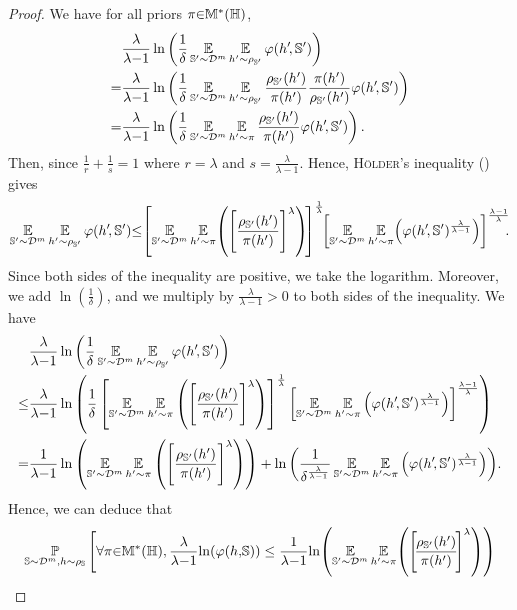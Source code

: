 \begin{noaddcontents}
\begin{proof}
We have for all priors $\pi{\in}\mathbb{M}^{*}(\mathbb{H})$,
\begin{align*}
&\frac{\lambda}{\lambda{-}1}\ln\left(\frac{1}{\delta}\operatorname*{\mathbb{E}}_{\mathbb{S}'{\sim}\mathcal{D}^{m}}\operatorname*{\mathbb{E}}_{h'{\sim} \rho_{\mathbb{S}'} }\varphi(h'\!, \mathbb{S}')\right)\\
= &\frac{\lambda}{\lambda{-}1}\ln\left(\frac{1}{\delta}\operatorname*{\mathbb{E}}_{\mathbb{S}'{\sim}\mathcal{D}^{m}}\operatorname*{\mathbb{E}}_{h'{\sim} \rho_{\mathbb{S}'} }\frac{\rho_{\mathbb{S}'} (h')}{\pi(h')}\frac{\pi(h')}{\rho_{\mathbb{S}'} (h')}\varphi(h'\!, \mathbb{S}')\right)\\
= &\frac{\lambda}{\lambda{-}1}\ln\left(\frac{1}{\delta}\operatorname*{\mathbb{E}}_{\mathbb{S}'{\sim}\mathcal{D}^{m}}\operatorname*{\mathbb{E}}_{h'{\sim} \pi}\frac{\rho_{\mathbb{S}'} (h')}{\pi(h')}\varphi(h'\!, \mathbb{S}')\right).
\end{align*}
Then, since $\tfrac{1}{r}+\tfrac{1}{s}=1$ where $r{=}\lambda$ and $s{=}\frac{\lambda}{\lambda-1}$. Hence, \textsc{Hölder}'s inequality () gives
\begin{align*}
    \EE_{\S'{\sim}\D^{\m}}\EE_{\h'{\sim} \AQp}\varphi(\h'\!, \S'){\le}\!\LB\EE_{\S'{\sim}\D^{\m}}\EE_{\h'{\sim} \P}\!\LP\Bigg[\frac{\AQp (\h')}{\P(\h')}\Bigg]^{\lambda}\RP\!\RB^{\frac{1}{\lambda}}\!\!\LB\EE_{\S'{\sim}\D^{\m}}\EE_{\h'{\sim} \P}\!\LP\varphi(\h'\!, \S')^{\frac{\lambda}{\lambda-1}}\RP\RB^{\frac{\lambda-1}{\lambda}}\!\!\!.
\end{align*}
Since both sides of the inequality are positive, we take the logarithm.
Moreover, we add $\ln(\tfrac{1}{\delta})$, and we multiply by $\frac{\lambda}{\lambda-1}>0$ to both sides of the inequality.
We have
\begin{align*}
    &\frac{\lambda}{\lambda{-}1}\ln\left(\frac{1}{\delta}\operatorname*{\mathbb{E}}_{\mathbb{S}'{\sim}\mathcal{D}^{m}}\operatorname*{\mathbb{E}}_{h'{\sim} \rho_{\mathbb{S}'} }\varphi(h'\!, \mathbb{S}')\right) \\
    \le &\frac{\lambda}{\lambda{-}1}\ln\left(\frac{1}{\delta}\left[\operatorname*{\mathbb{E}}_{\mathbb{S}'{\sim}\mathcal{D}^{m}}\operatorname*{\mathbb{E}}_{h'{\sim} \pi}\left(\Bigg[\frac{\rho_{\mathbb{S}'} (h')}{\pi(h')}\Bigg]^{\lambda}\right)\right]^{\frac{1}{\lambda}}\left[\operatorname*{\mathbb{E}}_{\mathbb{S}'{\sim}\mathcal{D}^{m}}\operatorname*{\mathbb{E}}_{h'{\sim} \pi}\left(\varphi(h'\!, \mathbb{S}')^{\frac{\lambda}{\lambda-1}}\right)\right]^{\frac{\lambda-1}{\lambda}}\right)\\
    = &\frac{1}{\lambda{-}1}\ln\left(\operatorname*{\mathbb{E}}_{\mathbb{S}'{\sim}\mathcal{D}^{m}}\operatorname*{\mathbb{E}}_{h'{\sim} \pi}\left(\Bigg[\frac{\rho_{\mathbb{S}'} (h')}{\pi(h')}\Bigg]^{\lambda}\right)\right) + \ln\left(\frac{1}{\delta^{\frac{\lambda}{\lambda{-}1}}}\operatorname*{\mathbb{E}}_{\mathbb{S}'{\sim}\mathcal{D}^{m}}\operatorname*{\mathbb{E}}_{h'{\sim} \pi}\left(\varphi(h'\!, \mathbb{S}')^{\frac{\lambda}{\lambda-1}}\right)\right)\!.
\end{align*}
Hence, we can deduce that 
\begin{align*}
    \PP_{\S\sim\D^{\m}, \h\sim \AQ}\Bigg[&\forall\P{\in}\M^{*}(\H), \frac{\lambda}{\lambda{-}1}\!\ln\!\LP\varphi(\h,\!\S)\RP \le \frac{1}{\lambda{-}1}\!\ln\!\LP\EE_{\S'{\sim}\D^{\m}}\EE_{\h'{\sim} \P}\!\LP\Bigg[\!\frac{\AQp (\h')}{\P(\h')}\!\Bigg]^{\lambda}\RP\RP\\

\end{align*}
\end{proof}
\end{noaddcontents}
